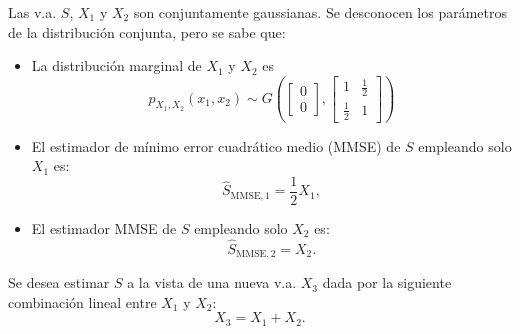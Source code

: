 \ifspanish

\question[20] %

Las v.a. $S$, $X_1$ y $X_2$ son conjuntamente gaussianas. Se desconocen los parámetros de la distribución conjunta, pero se sabe que:
\begin{itemize}
\item La distribución marginal de $X_1$ y $X_2$ es
$$p_{X_1,X_2}\left ( x_1,x_2\right) \sim G\left (  \left[ \begin{array}{c}   0 \\ 0    \end{array} \right] , \left[ \begin{array}{cc}  1 & \frac{1}{2} \\ \frac{1}{2} & 1  \end{array} \right]\right)$$
\item El estimador de mínimo error cuadrático medio (MMSE) de $S$ empleando solo $X_1$ es:
$$\widehat S_{\text{MMSE},1}=\frac{1}{2} X_1,$$
\item El estimador MMSE de $S$ empleando solo $X_2$ es:
$$\widehat S_{\text{MMSE},2}= X_2.$$
\end{itemize}

Se desea estimar $S$ a la vista de una nueva v.a. $X_3$ dada por la siguiente combinación lineal entre $X_1$ y $X_2$:
$$X_3= X_1 + X_2.$$


